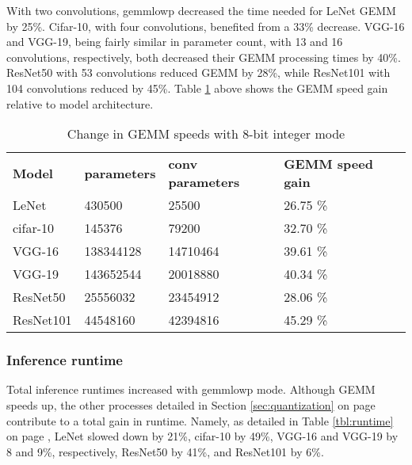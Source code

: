 With two convolutions, gemmlowp decreased the time needed for LeNet GEMM by 25\%. Cifar-10, with four convolutions, benefited from a 33\% decrease. VGG-16 and VGG-19, being fairly similar in parameter count, with 13 and 16 convolutions, respectively, both decreased their GEMM processing times by 40\%. ResNet50 with 53 convolutions reduced GEMM by 28\%, while ResNet101 with 104 convolutions reduced by 45\%. Table \ref{tbl:gains} above shows the GEMM speed gain relative to model architecture.

\begin{table}[]
\centering
\caption[GEMM speed gains]{Change in GEMM speeds with 8-bit integer mode}
\label{tbl:gains}
\begin{tabular}{llll}
\textbf{Model}     & \textbf{parameters} & \textbf{conv parameters} & \textbf{GEMM speed gain} \\
LeNet     & 430500              & 25500                    & 26.75 \%                  \\
cifar-10  & 145376              & 79200                    & 32.70 \%                  \\
VGG-16    & 138344128           & 14710464                 & 39.61 \%                  \\
VGG-19    & 143652544           & 20018880                 & 40.34 \%                  \\
ResNet50  & 25556032            & 23454912                 & 28.06 \%                  \\
ResNet101 & 44548160            & 42394816                 & 45.29 \%                 
\end{tabular}
\end{table}

\subsubsection{Inference runtime}
Total inference runtimes increased with gemmlowp mode. Although GEMM speeds up, the other processes detailed in Section \ref{sec:quantization} on page \pageref{sec:quantization} contribute to a total gain in runtime. Namely, as detailed in Table \ref{tbl:runtime} on page \pageref{tbl:runtime}, LeNet slowed down by 21\%, cifar-10 by 49\%, VGG-16 and VGG-19 by 8 and 9\%, respectively, ResNet50 by 41\%, and ResNet101 by 6\%.

